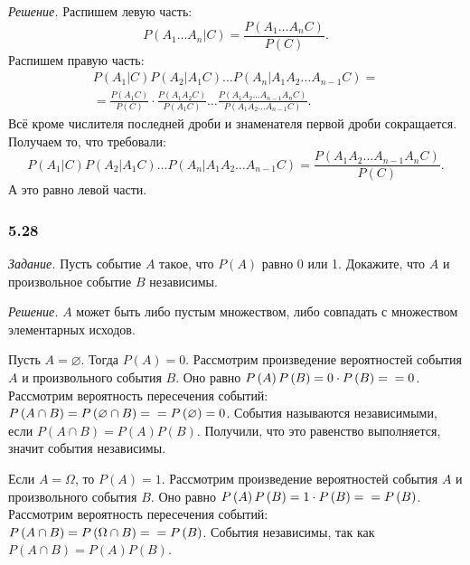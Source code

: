 \textit{Решение.} Распишем левую часть:
$$P \left( \left. A_1 \dotsc A_n \right| C \right) =
\frac{P \left( A_1 \dotsc A_n C \right) }{P \left( C \right) }.$$
Распишем правую часть:
\begin{equation*}
\begin{split}
P \left( \left. A_1 \right| C \right) P \left( \left. A_2 \right| A_1 C \right) \dotsc
P \left( \left. A_n \right| A_1 A_2 \dotsc A_{n-1} C \right) = \\
= \frac{P \left( A_1 C \right) }{P \left( C \right) } \cdot \frac{P \left( A_1 A_2 C \right) }{P \left( A_1 C \right) } \dotsc
\frac{P \left( A_1 A_2 \dotsc A_{n-1} A_n C \right) }{P \left( A_1 A_2 \dotsc A_{n-1} C \right) }.
\end{split}
\end{equation*}
Всё кроме числителя последней дроби и знаменателя первой дроби сокращается.
Получаем то, что требовали:
$$P \left( \left. A_1 \right| C \right) P \left( \left. A_2 \right| A_1 C \right) \dotsc
P \left( \left. A_n \right| A_1 A_2 \dotsc A_{n-1} C \right) =
\frac{P \left( A_1 A_2 \dotsc A_{n-1} A_n C \right) }{P \left( C \right) }.$$
А это равно левой части.

\subsubsection*{5.28}

\textit{Задание.} Пусть событие $A$ такое, что $P \left( A \right) $ равно 0 или 1.
Докажите, что $A$ и произвольное событие $B$ независимы.

\textit{Решение.} $A$ может быть либо пустым множеством, либо совпадать с множеством элементарных исходов.

Пусть $A = \varnothing$.
Тогда $P \left( A \right) = 0$.
Рассмотрим произведение вероятностей события $A$ и произвольного события $B$.
Оно равно $P \left( A \right) P \left( B \right) = 0 \cdot P \left( B \right) = \\ = 0$.
Рассмотрим вероятность пересечения событий: $P \left( A \cap B \right) = P \left( \varnothing \cap B \right) = \\ = P \left( \varnothing \right) = 0$.
События называются независимыми, если $P \left( A \cap B \right) = P \left( A \right) P \left( B \right) $.
Получили, что это равенство выполняется, значит события независимы.

Если $A = \Omega $, то $P \left( A \right) = 1$.
Рассмотрим произведение вероятностей события $A$ и произвольного события $B$.
Оно равно $P \left( A \right) P \left( B \right) = 1 \cdot P \left( B \right) = \\ = P \left( B \right)$.
Рассмотрим вероятность пересечения событий: $P \left( A \cap B \right) = P \left( \Omega \cap B \right) = \\ = P \left( B \right) $.
События независимы, так как $P \left( A \cap B \right) = P \left( A \right) P \left( B \right) $.
